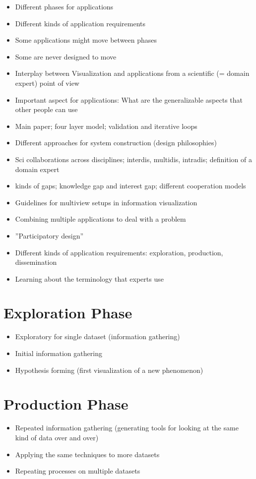 \begin{itemize}
\item Different phases for applications
\item Different kinds of application requirements
\item Some applications might move between phases
\item Some are never designed to move
\item Interplay between Visualization and applications from a scientific (= domain expert) point of view
\item Important aspect for applications: What are the generalizable aspects that other people can use
\item \cite{munzner2009nested} Main paper; four layer model; validation and iterative loops
\item \cite{tory2004human} Different approaches for system construction (design philosophies)
\item \cite{kirby2013visualization} Sci collaborations across disciplines; interdis, multidis, intradis; definition of a domain expert
\item \cite{van2006bridging} kinds of gaps; knowledge gap and interest gap; different cooperation models
\item \cite{wang2000guidelines} Guidelines for multiview setups in information visualization
\item Combining multiple applications to deal with a problem \cite{rungta2013manyvis}
\item ''Participatory design''
\item Different kinds of application requirements: exploration, production, dissemination
\item Learning about the terminology that experts use
\end{itemize}

\section{Exploration Phase}
\begin{itemize}
\item Exploratory for single dataset (information gathering)
\item Initial information gathering
\item Hypothesis forming (first visualization of a new phenomenon)
\end{itemize}

\section{Production Phase}
\begin{itemize}
\item Repeated information gathering (generating tools for looking at the same kind of data over and over)
\item Applying the same techniques to more datasets
\item Repeating processes on multiple datasets
\end{itemize}

